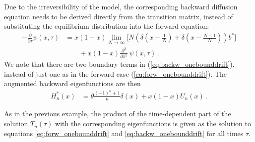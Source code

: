 \documentclass[preprint]{elsarticle}
\newcommand\given{{\,|\,}}
\begin{document}
Due to the irreversibility of the model, the corresponding backward diffusion equation needs to be derived directly from the transition matrix, instead of substituting the equilibrium distribution into the forward equation:
\begin{equation}\label{eq:backw_onebounddrift}
\begin{split}
-\frac{\partial}{\partial \tau} \psi(x,\tau)&=
    x(1-x)\lim_{N\to\infty}\bigg[N\left(\delta(x-\tfrac1N)+\delta(x-\tfrac{N-1}N)\right)b^{*}\bigg]\\
    &\qquad+x(1-x)\frac{\partial^2}{\partial x^2}\,\psi(x,\tau)\,.
\end{split}
\end{equation}
We note that there are two boundary terms in (\ref{eq:backw_onebounddrift}), instead of just one as in the forward case (\ref{eq:forw_onebounddrift}). 
The augmented backward eigenfunctions are then
\begin{equation}\label{eq:backw_oneboundeigen}
\begin{split}
    H_n^{*}(x)&=\theta\tfrac{(-1)^n+1}{ n}\delta(x)+x(1-x)U_n(x)\,.
\end{split}
\end{equation}

As in the previous example, the product of the time-dependent part of the solution $T_n(\tau)$ with the corresponding eigenfunctions is given as the solution to equations \eqref{eq:forw_onebounddrift} and \eqref{eq:backw_onebounddrift} for all times $\tau$.


\end{document}
